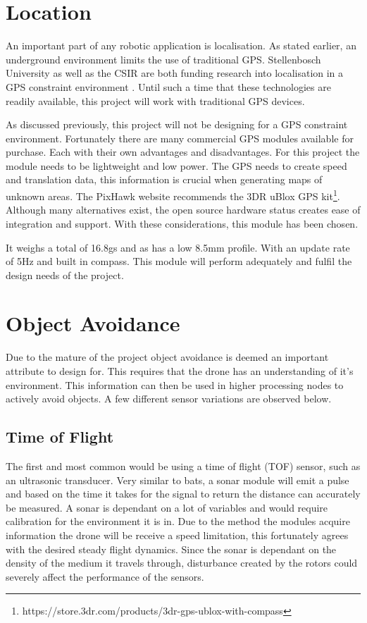 		

		
		\section{Location}
		An important part of any robotic application is localisation. As stated earlier, an underground environment limits the use of traditional GPS. Stellenbosch University as well as the CSIR are both funding research into localisation in a GPS constraint environment . Until such a time that these technologies are readily available, this project will work with traditional GPS devices.
			
		As discussed previously, this project will not be designing for a GPS constraint environment. Fortunately there are many commercial  GPS modules available for purchase. Each with their own advantages and disadvantages. For this project the module needs to be lightweight and low power. The GPS needs to create speed and translation data, this information is crucial when generating maps of unknown areas. The PixHawk website recommends the 3DR uBlox GPS kit\footnote{https://store.3dr.com/products/3dr-gps-ublox-with-compass}. Although many alternatives exist, the open source hardware status creates ease of integration and support. With these considerations, this module has been chosen.
			
		It weighs a total of 16.8gs and as has a low 8.5mm profile. With an update rate of 5Hz and built in compass. This module will perform adequately and fulfil the design needs of the project.
			 
		\section{Object Avoidance}\label{SECT_ObjectAvoidance}
		Due to the mature of the project object avoidance is deemed an important attribute to design for. This requires that the drone has an understanding of it's environment. This information can then be used in higher processing nodes to actively avoid objects. A few different sensor variations are observed below. 
	
			\subsection{Time of Flight}		
			The first and most common would be using a time of flight (TOF) sensor, such as an ultrasonic transducer. Very similar to bats, a sonar module will emit a pulse and based on the time it takes for the signal to return the distance can accurately be measured. A sonar is dependant on a lot of variables and would require calibration for the environment it is in. Due to the method the modules acquire information the drone will be receive a speed limitation, this fortunately agrees with the desired steady flight dynamics. Since the sonar is dependant on the density of the medium it travels through, disturbance created by the rotors could severely affect the performance of the sensors.
			
